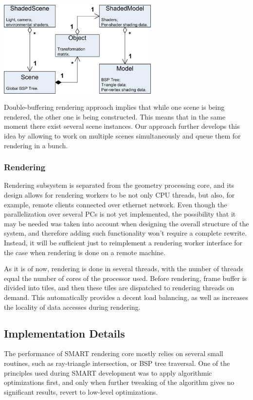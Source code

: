 \documentclass{article}
\begin{document}
\begin{center}
\includegraphics[width=80mm]{Overall.png}
\end{center}

Double-buffering rendering approach implies that while one scene is being rendered, the other one is being constructed. This means that in the same moment there exist several scene instances. Our approach further develops this idea by allowing to work on multiple scenes simultaneously and queue them for rendering in a bunch.

\subsubsection{Rendering}
Rendering subsystem is separated from the geometry processing core, and its design allows for rendering workers to be not only CPU threads, but also, for example, remote clients connected over ethernet network. Even though the parallelization over several PCs is not yet implemented, the possibility that it may be needed was taken into account when designing the overall structure of the system, and therefore adding such functionality won't require a complete rewrite. Instead, it will be sufficient just to reimplement a rendering worker interface for the case when rendering is done on a remote machine.

As it is of now, rendering is done in several threads, with the number of threads equal the number of cores of the processor used. Before rendering, frame buffer is divided into tiles, and then these tiles are dispatched to rendering threads on demand. This automatically provides a decent load balancing, as well as increases the locality of data accesses during rendering.


\subsection{Implementation Details}
The performance of SMART rendering core mostly relies on several small routines, such as ray-triangle intersection, or BSP tree traversal. One of the principles used during SMART development was to apply algorithmic optimizations first, and only when further tweaking of the algorithm gives no significant results, revert to low-level optimizations. 
\end{document}

